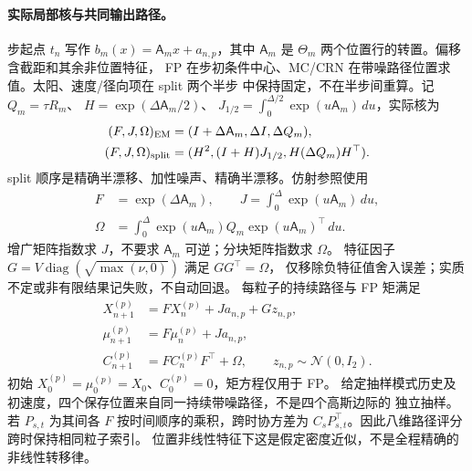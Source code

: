 \documentclass[UTF8,11pt]{ctexart}
\begin{document}
\paragraph{实际局部核与共同输出路径。}
步起点 \(t_n\) 写作 \(b_m(x)=\mathsf A_m x+a_{n,p}\)，其中
\(\mathsf A_m\) 是 \(\Theta_m\) 两个位置行的转置。偏移含截距和其余非位置特征，
FP 在步初条件中心、MC/CRN 在带噪路径位置求值。太阳、速度/径向项在 split 两个半步
中保持固定，不在半步间重算。记 \(Q_m=\tau R_m\)、
\(H=\exp(\Delta\mathsf A_m/2)\)、
\(J_{1/2}=\int_0^{\Delta/2}\exp(u\mathsf A_m)\,du\)，实际核为
\begin{equation}
\begin{aligned}
(F,J,\Omega)_{\rm EM}&=(I+\Delta\mathsf A_m,\Delta I,\Delta Q_m),\\
(F,J,\Omega)_{\rm split}&=(H^2,(I+H)J_{1/2},H(\Delta Q_m)H^\top).
\end{aligned}
\label{eq:method-kernels}
\end{equation}
split 顺序是精确半漂移、加性噪声、精确半漂移。仿射参照使用
\begin{equation}
\begin{aligned}
F&=\exp(\Delta\mathsf A_m),\qquad
J=\int_0^\Delta\exp(u\mathsf A_m)\,du,\\
\Omega&=\int_0^\Delta\exp(u\mathsf A_m)Q_m\exp(u\mathsf A_m)^\top\,du.
\end{aligned}
\label{eq:method-affine-exact}
\end{equation}
增广矩阵指数求 \(J\)，不要求 \(\mathsf A_m\) 可逆；分块矩阵指数求 \(\Omega\)。
特征因子 \(G=V\operatorname{diag}(\sqrt{\max(\nu,0)})\) 满足 \(GG^\top=\Omega\)，
仅移除负特征值舍入误差；实质不定或非有限结果记失败，不自动回退。
每粒子的持续路径与 FP 矩满足
\begin{equation}
\begin{aligned}
X_{n+1}^{(p)}&=F X_n^{(p)}+J a_{n,p}+Gz_{n,p},\\
\mu_{n+1}^{(p)}&=F\mu_n^{(p)}+J a_{n,p},\\
C_{n+1}^{(p)}&=F C_n^{(p)}F^\top+\Omega,
\qquad z_{n,p}\sim\mathcal N(0,I_2).
\end{aligned}
\label{eq:method-joint-propagation}
\end{equation}
初始 \(X_0^{(p)}=\mu_0^{(p)}=X_0\)、\(C_0^{(p)}=0\)，矩方程仅用于 FP。
给定抽样模式历史及初速度，四个保存位置来自同一持续带噪路径，不是四个高斯边际的
独立抽样。若 \(P_{s,t}\) 为其间各 \(F\) 按时间顺序的乘积，跨时协方差为
\(C_sP_{s,t}^{\top}\)。因此八维路径评分跨时保持相同粒子索引。
位置非线性特征下这是假定密度近似，不是全程精确的非线性转移律。
\end{document}
